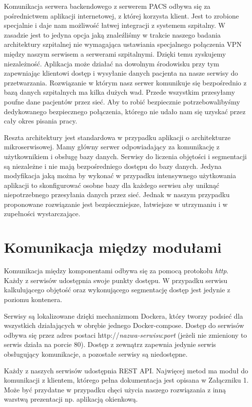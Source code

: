 \documentclass[a4paper,11pt,twoside]{report}
\theoremstyle{definition}
\begin{document}
Komunikacja serwera backendowego z serwerem PACS odbywa się za pośrednictwem aplikacji internetowej, z której korzysta klient. Jest to zrobione specjalnie i daje nam możliwość łatwej integracji z systemem szpitalny. W zasadzie jest to jedyna opcja jaką znaleźliśmy w trakcie naszego badania architektury szpitalnej nie wymagająca ustawiania specjalnego połączenia VPN między naszym serwisem a serwerami szpitalnymi. Dzięki temu zyskujemy niezależność. Aplikacja może działać na dowolnym środowisku przy tym zapewniając klientowi dostęp i wysyłanie danych pacjenta na nasze serwisy do przetwarzania.
Rozwiązanie w którym nasz serwer komunikuje się bezpośrednio z bazą danych szpitalnych ma kilka dużych wad. Przede wszystkim przesyłamy poufne dane pacjentów przez sieć. Aby to robić bezpiecznie potrzebowalibyśmy dedykowanego bezpiecznego połączenia, którego nie udało nam się uzyskać przez cały okres pisania pracy.
\par
Reszta architektury jest standardowa w przypadku aplikacji o architekturze mikroserwisowej. Mamy główny serwer odpowiadający za komunikację z użytkownikiem i obsługę bazy danych. Serwisy do liczenia objętości i segmentacji są niezależne i nie mają bezpośredniego dostępu do bazy danych.
Jedyna modyfikacja jaką można by wykonać w przypadku intensywnego użytkowania aplikacji to skonfigurować osobne bazy dla każdego serwisu aby uniknąć niepotrzebnego przesyłania danych przez sieć. Jednak w naszym przypadku proponowane rozwiązanie jest bezpieczniejsze, łatwiejsze w utrzymaniu i w zupełności wystarczające.

\section{Komunikacja między modułami}

Komunikacja między komponentami odbywa się za pomocą protokołu \textit{http}. Każdy z serwisów udostępnia swoje punkty dostępu. W przypadku serwisu kalkulującego objętość oraz wykonującego segmentację dostęp jest jedynie z poziomu kontenera.
\par
Serwisy są lokalizowane dzięki mechanizmom Dockera, który tworzy podsieć dla wszystkich działających w obrębie jednego Docker-compose. Dostęp do serwisów odbywa się przez adres postaci http://\textit{nazwa-serwisu}:\textit{port} (jeżeli nie zmieniony to serwis działa na porcie 80). Dostęp z zewnątrz zapewnia jedynie serwis obsługujący komunikacje, a pozostałe serwisy są niedostępne.
\par
Każdy z naszych serwisów udostępnia REST API. Najwięcej metod ma moduł do komunikacji z klientem, którego pełna dokumentacja jest opisana w Załączniku 1. Może być przydatne w przypadku chęci użycia naszego rozwiązania z inną warstwą prezentacji np. aplikacją okienkową.
\end{document}
